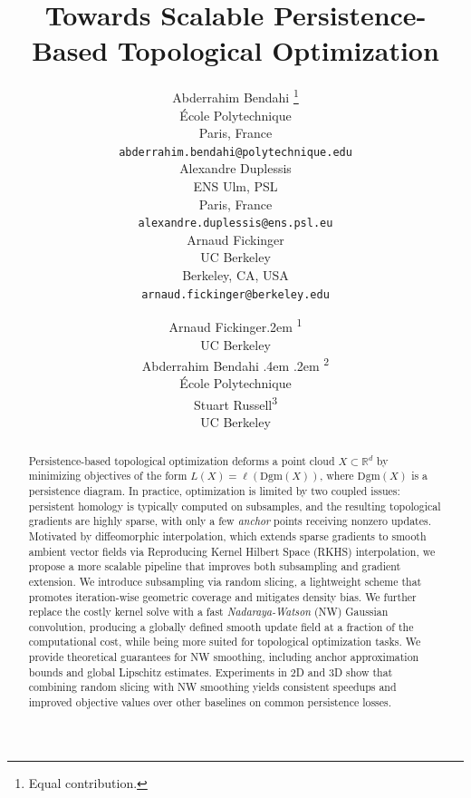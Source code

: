 \documentclass{article} %
\title{Towards Scalable Persistence-Based Topological Optimization}
\author{Abderrahim Bendahi \thanks{Equal contribution.} \\
\'Ecole Polytechnique\\
Paris, France\\
\texttt{abderrahim.bendahi@polytechnique.edu} \\
\And
Alexandre Duplessis \footnotemark[\value{footnote}] \\
ENS Ulm, PSL \\
Paris, France \\
\texttt{alexandre.duplessis@ens.psl.eu} \\
\AND
Arnaud Fickinger \\
UC Berkeley \\
Berkeley, CA, USA \\
\texttt{arnaud.fickinger@berkeley.edu}
}
\author{%
  Arnaud Fickinger\kern.2em \textsuperscript{1} \\
  UC Berkeley \\
  \And
  Abderrahim Bendahi \kern.4em \kern.2em \textsuperscript{2}\\
  École Polytechnique \\
  \And
  Stuart Russell\textsuperscript{3} \\
  UC Berkeley \\
}
\newcommand{\R}{\mathbb{R}}
\newcommand{\Dgm}{\mathrm{Dgm}}
\theoremstyle{plain}
\theoremstyle{definition}
\theoremstyle{remark}
\begin{document}
\maketitle

\begin{abstract}
Persistence-based topological optimization deforms a point cloud $X\subset\R^d$ by minimizing objectives of the form $L(X)=\ell(\Dgm(X))$, where $\Dgm(X)$ is a persistence diagram. In practice, optimization is limited by two coupled issues: persistent homology is typically computed on subsamples, and the resulting topological gradients are highly sparse, with only a few \emph{anchor} points receiving nonzero updates. Motivated by diffeomorphic interpolation, which extends sparse gradients to smooth ambient vector fields via Reproducing Kernel Hilbert Space (RKHS) interpolation, we propose a more scalable pipeline that improves both subsampling and gradient extension. We introduce subsampling via random slicing, a lightweight scheme that promotes iteration-wise geometric coverage and mitigates density bias. We further replace the costly kernel solve with a fast \emph{Nadaraya-Watson} (NW) Gaussian convolution, producing a globally defined smooth update field at a fraction of the computational cost, while being more suited for topological optimization tasks. We provide theoretical guarantees for NW smoothing, including anchor approximation bounds and global Lipschitz estimates.
Experiments in $2$D and $3$D show that combining random slicing with NW smoothing yields consistent speedups and improved objective values over other baselines on common persistence losses.
\end{abstract}
\end{document}
